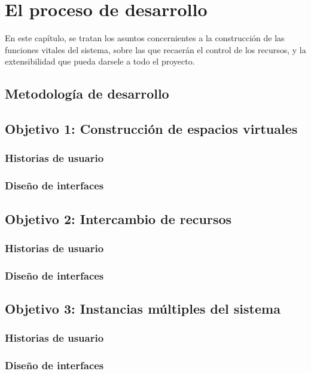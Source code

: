 \chapter{El proceso de desarrollo}

En este capítulo, se tratan los asuntos concernientes a la construcción de las
funciones vitales del sistema, sobre las que recaerán el control de los
recursos, y la extensibilidad que pueda darsele a todo el proyecto.

\section{Metodología de desarrollo}

\section{Objetivo 1: Construcción de espacios virtuales}
\subsection{Historias de usuario}
\subsection{Diseño de interfaces}

\section{Objetivo 2: Intercambio de recursos}
\subsection{Historias de usuario}
\subsection{Diseño de interfaces}

\section{Objetivo 3: Instancias múltiples del sistema}
\subsection{Historias de usuario}
\subsection{Diseño de interfaces}

